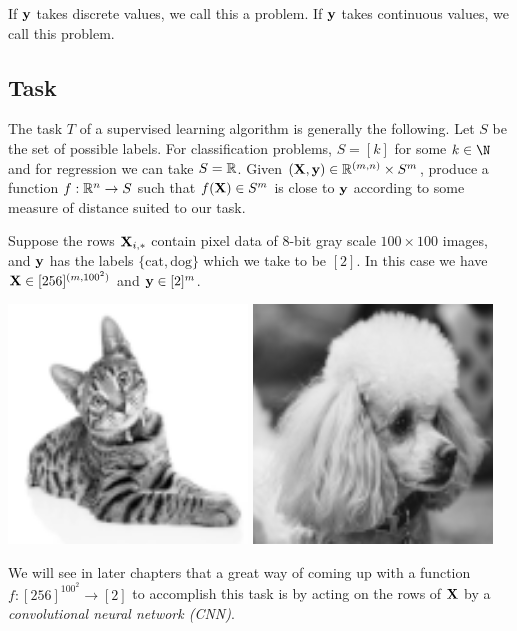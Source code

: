 \begin{definition}
If $\vy$ takes discrete values, we call this a  problem. If $\vy$ takes continuous values, we call this  problem. 
\end{definition}


\subsection{Task}

The task $T$ of a supervised learning algorithm is generally the following. Let $S$ be the set of possible labels. For classification problems, $S = [k]$ for some $k\in\N$ and for regression we can take $S = \R$. Given $(\MX, \vy)\in\R^{(m,n)}\times S^m$, produce a function $f: \R^n \to S$ such that $f(\MX)\in S^m$ is close to $\vy$ according to some measure of distance suited to our task. 

\begin{example}
Suppose the rows $\MX_{i,\ast}$ contain pixel data of 8-bit gray scale $100\times 100$ images, and $\vy$ has the labels $\{\text{cat},\text{dog}\}$ which we take to be $[2]$. In this case we have $\MX\in[256]^{(m,100^2)}$ and $\vy\in[2]^m$.
\begin{center}
    \includegraphics[width=2.5in]{images/Chapter6/grayscale_cat.png}
    \includegraphics[width=2.5in]{images/Chapter6/grayscale_dog.png}
\end{center}
We will see in later chapters that a great way of coming up with a function $f:[256]^{100^2} \to [2]$ to accomplish this task is by acting on the rows of $\MX$ by a \textit{convolutional neural network (CNN)}.
\end{example}

